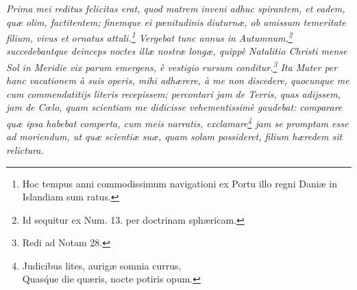 \documentclass[a4paper, 11pt, oneside, polutonikogreek, german]{article}
\begin{document}
\emph{Prima mei reditus felicitas erat, quod matrem inveni adhuc spirantem, et eadem, quæ olim, factitentem; finemque ei pœnitudinis diuturnæ, ob amissum temeritate filium, vivus et ornatus attuli.\footnote{Hoc tempus anni commodissimum navigationi ex Portu illo regni Daniæ in Islandiam sum ratus.} Vergebat tunc annus in Autumnum,\footnote{Id sequitur ex Num. 13. per doctrinam sphæricam.} succedebantque deinceps noctes illæ nostræ longæ, quippè Natalitio Christi mense Sol in Meridie vix parum emergens, è vestigio rursum conditur.\footnote{Redi ad Notam 28.} Ita Mater per hanc vacationem à suis operis, mihi adhærere, à me non discedere, quocunque me cum commendatitijs literis recepissem; percontari jam de Terris, quas adijssem, jam de Cœlo, quam scientiam me didicisse vehementissimè gaudebat: comparare quæ ipsa habebat comperta, cum meis narratis, exclamare\footnote{Judicibus lites, aurigæ somnia currus,\\\hspace*{5mm}Quas\'que die quæris, nocte potiris opum.} jam se promptam esse ad moriendum, ut quæ scientiæ suæ, quam solam possideret, filium hæredem sit relictura.}
\end{document}
